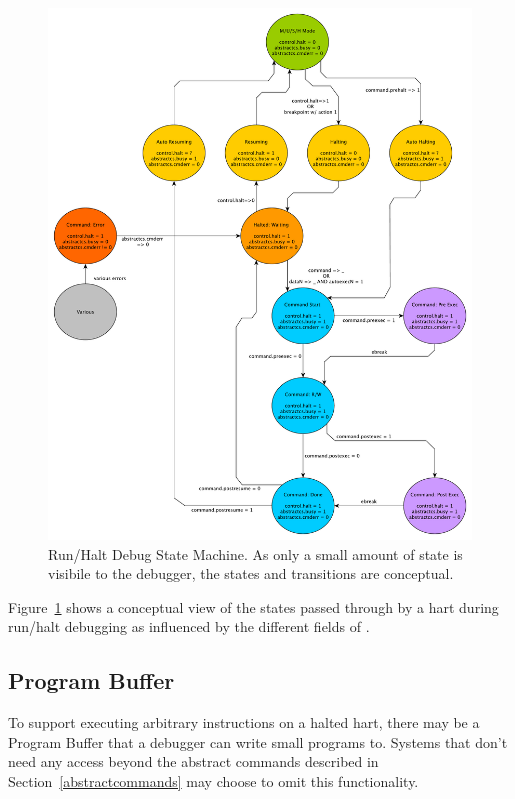\documentclass{article}
\begin{document}
\begin{figure}
   \centering
   \includegraphics[width=\textwidth]{fig/abstract_commands.pdf}
   \caption[Run/Halt Debug State Machine]{Run/Halt Debug State Machine.
     As only a small amount of state is visibile to the debugger,
     the states and transitions are conceptual.}
   \label{fig:abstract_sm}
\end{figure}

Figure~\ref{fig:abstract_sm} shows a conceptual view of the states
passed through by a hart during run/halt debugging as influenced
by the different fields of \Rcommand.

\subsection{Program Buffer} \label{programbuffer}

To support executing arbitrary instructions on a halted hart, there may be a
Program Buffer that a debugger can write small programs to. Systems that don't
need any access beyond the abstract commands described in
Section~\ref{abstractcommands} may choose to omit this functionality.
\end{document}
